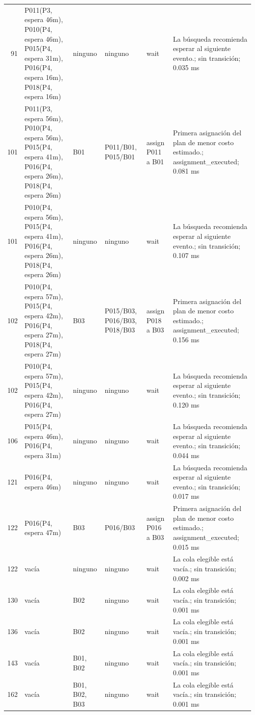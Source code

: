 \begin{longtable}{r p{3.0cm} p{1.25cm} p{2.7cm} p{2.0cm} p{2.4cm}}
91 & P011(P3, espera 46m), P010(P4, espera 46m), P015(P4, espera 31m), P016(P4, espera 16m), P018(P4, espera 16m) & ninguno & ninguno & wait & La búsqueda recomienda esperar al siguiente evento.; sin transición; 0.035 ms \\
101 & P011(P3, espera 56m), P010(P4, espera 56m), P015(P4, espera 41m), P016(P4, espera 26m), P018(P4, espera 26m) & B01 & P011/B01, P015/B01 & assign P011 a B01 & Primera asignación del plan de menor costo estimado.; assignment\_executed; 0.081 ms \\
101 & P010(P4, espera 56m), P015(P4, espera 41m), P016(P4, espera 26m), P018(P4, espera 26m) & ninguno & ninguno & wait & La búsqueda recomienda esperar al siguiente evento.; sin transición; 0.107 ms \\
102 & P010(P4, espera 57m), P015(P4, espera 42m), P016(P4, espera 27m), P018(P4, espera 27m) & B03 & P015/B03, P016/B03, P018/B03 & assign P018 a B03 & Primera asignación del plan de menor costo estimado.; assignment\_executed; 0.156 ms \\
102 & P010(P4, espera 57m), P015(P4, espera 42m), P016(P4, espera 27m) & ninguno & ninguno & wait & La búsqueda recomienda esperar al siguiente evento.; sin transición; 0.120 ms \\
106 & P015(P4, espera 46m), P016(P4, espera 31m) & ninguno & ninguno & wait & La búsqueda recomienda esperar al siguiente evento.; sin transición; 0.044 ms \\
121 & P016(P4, espera 46m) & ninguno & ninguno & wait & La búsqueda recomienda esperar al siguiente evento.; sin transición; 0.017 ms \\
122 & P016(P4, espera 47m) & B03 & P016/B03 & assign P016 a B03 & Primera asignación del plan de menor costo estimado.; assignment\_executed; 0.015 ms \\
122 & vacía & ninguno & ninguno & wait & La cola elegible está vacía.; sin transición; 0.002 ms \\
130 & vacía & B02 & ninguno & wait & La cola elegible está vacía.; sin transición; 0.001 ms \\
136 & vacía & B02 & ninguno & wait & La cola elegible está vacía.; sin transición; 0.001 ms \\
143 & vacía & B01, B02 & ninguno & wait & La cola elegible está vacía.; sin transición; 0.001 ms \\
162 & vacía & B01, B02, B03 & ninguno & wait & La cola elegible está vacía.; sin transición; 0.001 ms \\
\bottomrule
\end{longtable}

